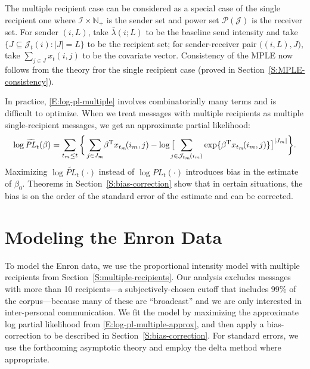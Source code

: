 \documentclass[aoas,preprint]{imsart}
\begin{document}
The multiple recipient case can be considered as a special case of
the single recipient one where $\mathcal{I} \times \mathbb{N}_+$
is the sender set and power set $\mathcal{P}(\mathcal{J})$ is the
receiver set.  For sender $(i,L)$, take $\bar \lambda(i ; L)$ to be the
baseline send intensity and take
$\{ J \subseteq \mathcal{J}_t(i) : |J| = L\}$ to be the recipient set; for
sender-receiver pair $\big((i,L), J\big)$, take $\sum_{j \in J} x_t(i,j)$ to
be the covariate vector.  Consistency of the MPLE now follows from
the theory fror the single recipient case (proved in
Section~\ref{S:MPLE-consistency}).

In practice, \eqref{E:log-pl-multiple} involves combinatorially many terms
and is difficult to optimize.  When we treat messages with multiple recipients
as multiple single-recipient messages, we get an approximate partial
likelihood:
\begin{equation}\label{E:log-pl-multiple-approx}
    \log
    \widetilde{\mathit{PL}}_t(\beta)
        =
        \sum_{t_m \leq t}
        \bigg\{
            \sum_{j \in J_m}\!
                \beta^\trans x_{t_m}\!(i_m, j)
            -
            \log\big[
                \!\!\!\!
                \sum_{j \in \mathcal{J}_{t_m}\!(i_m)}
                    \exp\{ \beta^\trans x_{t_m}\!(i_m, j)\}
            \big]^{|J_m|}
        \bigg\}.
\end{equation}
Maximizing $\log \widetilde{\mathit{PL}}_t(\cdot)$ instead of
$\log \mathit{PL}_t(\cdot)$ introduces bias in the estimate of $\beta_0$.
Theorems in Section~\ref{S:bias-correction} show that in certain situations,
the bias is on the order of the standard error of the estimate and can be
corrected. 


\section{Modeling the Enron Data}\label{S:enron-modeling}

To model the Enron data, we use the proportional intensity model with multiple
recipients from Section~\ref{S:multiple-recipients}.  Our analysis excludes
messages with more than 10 recipients---a
subjectively-chosen cutoff that includes 99\% of the corpus---because many of
these are ``broadcast'' and we are only interested in inter-personal
communication.  We fit the model by maximizing the approximate log partial
likelihood from \eqref{E:log-pl-multiple-approx}, and then apply
a bias-correction to be described in Section~\ref{S:bias-correction}.  For standard
errors, we use the forthcoming asymptotic theory and employ the delta method where
appropriate.
\end{document}
